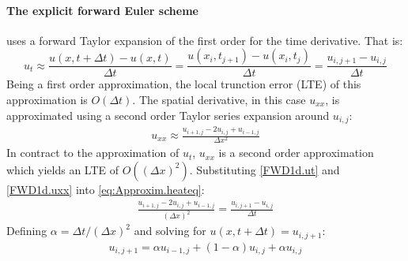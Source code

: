 \documentclass[%
oneside,                 %
final,                   %
10pt]{article}
\begin{document}
\paragraph{The explicit forward Euler scheme} uses a forward Taylor expansion of the first order for the time derivative. That is\citep[p. 305]{HJ15}:
\begin{equation}
u_{t} \approx \frac{u(x, t +\Delta t)- u(x,t)}{\Delta t} =\frac{u(x_i, t_{j+1})- u(x_i,t_j)}{\Delta t} =\frac{u_{i,j+1}- u_{i,j}}{\Delta t} \label{FWD1d.ut}
\end{equation}
Being a first order approximation, the local trunction error (LTE) of this approximation is $O(\Delta t)$. The spatial derivative, in this case $u_{xx}$, is approximated using a second order Taylor series expansion around $u_{i,j}$:
\begin{align}
u_{xx} \approx \frac{u_{i+1,j} -2u_{i,j}+u_{i-1,j}}{\Delta x^2} \label{FWD1d.uxx}
\end{align}
In contract to the approximation of $u_t$, $u_{xx}$ is a second order approximation which yields an LTE of $O((\Delta x)^2)$. Substituting \eqref{FWD1d.ut} and \eqref{FWD1d.uxx} into \eqref{eq:Approxim.heateq}:
\begin{align*}
\frac{u_{i+1,j} -2u_{i,j}+u_{i-1,j}}{(\Delta x)^2}=\frac{u_{i,j+1}- u_{i,j}}{\Delta t} 
\end{align*}
Defining $\alpha=\Delta t/(\Delta x)^2$ and solving for $u(x,t+\Delta t)=u_{i,j+1}$:
\begin{align}
u_{i,j+1}= \alpha u_{i-1,j}+(1-\alpha)u_{i,j}+\alpha u_{i,j} \label{eq:Approximation.FWDnew}
\end{align}
\end{document}
